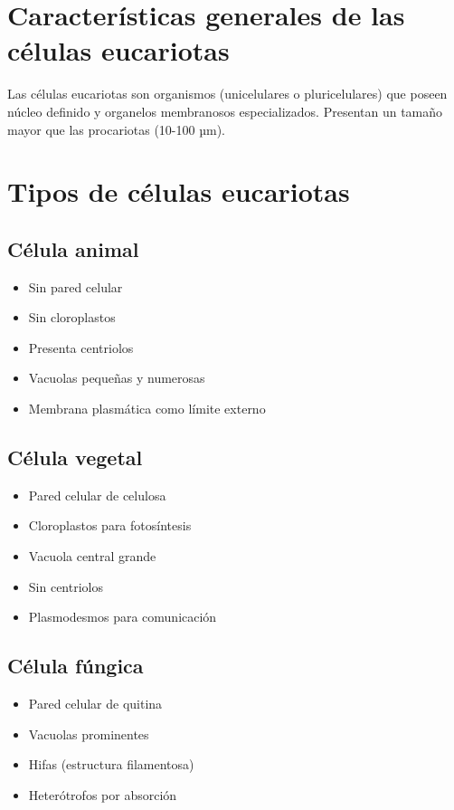 \section{Características generales de las células eucariotas}

Las células eucariotas son organismos (unicelulares o pluricelulares) que poseen núcleo definido y organelos membranosos especializados. Presentan un tamaño mayor que las procariotas (10-100 µm).

\section{Tipos de células eucariotas}

\subsection{Célula animal}
\begin{itemize}
    \item Sin pared celular
    \item Sin cloroplastos
    \item Presenta centriolos
    \item Vacuolas pequeñas y numerosas
    \item Membrana plasmática como límite externo
\end{itemize}

\subsection{Célula vegetal}
\begin{itemize}
    \item Pared celular de celulosa
    \item Cloroplastos para fotosíntesis
    \item Vacuola central grande
    \item Sin centriolos
    \item Plasmodesmos para comunicación
\end{itemize}

\subsection{Célula fúngica}
\begin{itemize}
    \item Pared celular de quitina
    \item Vacuolas prominentes
    \item Hifas (estructura filamentosa)
    \item Heterótrofos por absorción
\end{itemize}

